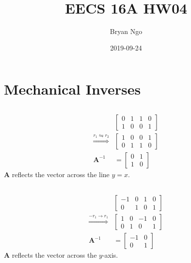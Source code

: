 \documentclass[]{article}
\title{EECS 16A HW04}
\author{Bryan Ngo}
\date{2019-09-24}
\numberwithin{equation}{section}
\begin{document}
\maketitle

\section{Mechanical Inverses}

\subsection{}

\begin{align}
	&\left[
	\begin{array}{cc|cc}
	0 & 1 & 1 & 0 \\
	1 & 0 & 0 & 1
	\end{array}
	\right] \\
	\overset{r_1 \leftrightharpoons r_2}{\Longrightarrow} &\left[
	\begin{array}{cc|cc}
	1 & 0 & 0 & 1 \\
	0 & 1 & 1 & 0
	\end{array}
	\right] \\
	\mathbf{A}^{-1} &= 
	\begin{bmatrix}
	0 & 1 \\
	1 & 0
	\end{bmatrix}
\end{align}
\(\mathbf{A}\) reflects the vector across the line \(y = x\). 

\subsection{}

\begin{align}
	&\left[
	\begin{array}{cc|cc}
	-1 & 0 & 1 & 0 \\
	0 & 1 & 0 & 1
	\end{array}
	\right] \\
	\overset{-r_1 \to r_1}{\Longrightarrow} &\left[
	\begin{array}{cc|cc}
	1 & 0 & -1 & 0 \\
	0 & 1 & 0 & 1
	\end{array}
	\right] \\
	\mathbf{A}^{-1} &= 
	\begin{bmatrix}
	-1 & 0 \\
	0 & 1
	\end{bmatrix}
\end{align}
\(\mathbf{A}\) reflects the vector across the \(y\)-axis. 
\end{document}
